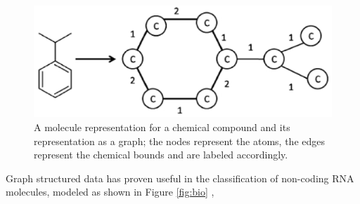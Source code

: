 \begin{figure}[ht]
    \centering
    \includegraphics[scale=0.4]{Figures/chcomp}
    \caption{A molecule representation for a chemical compound and its representation
    as a graph; the nodes represent the atoms, the edges represent the chemical bounds and
    are labeled accordingly.}
    \label{fig:chem}
\end{figure}

Graph structured data has proven useful in the classification of non-coding RNA
molecules, modeled as shown in Figure \ref{fig:bio} \cite{nnavarin, conf/psb/KarklinMH05},

